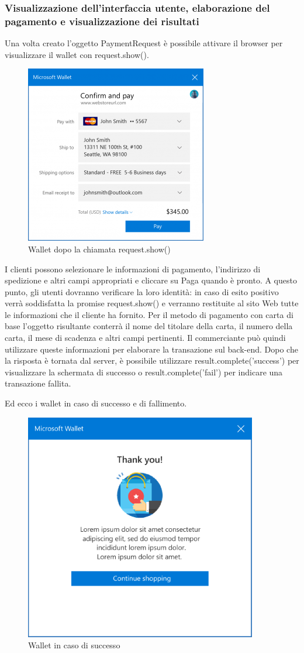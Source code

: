 \documentclass[11pt ,a4paper , twoside , openright ]{article}
\begin{document}
\subsubsection{Visualizzazione dell'interfaccia utente, elaborazione del pagamento e visualizzazione dei risultati}
Una volta creato l'oggetto PaymentRequest è possibile attivare il browser per visualizzare il wallet con request.show(). 
\begin{figure}[h]
	\centering
	\includegraphics[width=0.5\linewidth]{wallet1}
	\caption{Wallet dopo la chiamata request.show()}
	\label{fig: Wallet dopo la chiamata request.show()}
\end{figure}
I clienti possono  selezionare le informazioni di pagamento, l'indirizzo di spedizione e altri campi appropriati e cliccare su Paga quando è pronto. A questo punto, gli utenti dovranno verificare la loro identità: in caso di esito positivo verrà soddisfatta la promise request.show() e verranno restituite al sito Web tutte le informazioni che il cliente ha fornito. Per il metodo di pagamento con carta di base l'oggetto risultante conterrà il nome del titolare della carta, il numero della carta, il mese di scadenza e altri campi pertinenti. Il commerciante può quindi utilizzare queste informazioni per elaborare la transazione sul back-end.
Dopo che la risposta è tornata dal server, è possibile utilizzare result.complete('success') per visualizzare la schermata di successo o result.complete('fail') per indicare una transazione fallita.

\pagebreak
Ed ecco i wallet in caso di successo e di fallimento.
\begin{figure}[h]
	\centering
	\includegraphics[width=0.5\linewidth]{wallet2}
	\caption{Wallet in caso di successo}
	\label{fig: Wallet in caso di successo}
\end{figure}
\end{document}
